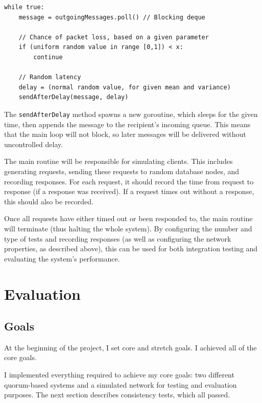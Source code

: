 \documentclass[12pt,a4paper,twoside,openany]{report}
\begin{document}
\begin{lstlisting}
while true:
    message = outgoingMessages.poll() // Blocking deque

    // Chance of packet loss, based on a given parameter
    if (uniform random value in range [0,1]) < x:
        continue

    // Random latency
    delay = (normal random value, for given mean and variance)
    sendAfterDelay(message, delay)
\end{lstlisting}

The \verb|sendAfterDelay| method spawns a new goroutine, which sleeps for the given time, then appends the message to the recipient's incoming queue. This means that the main loop will not block, so later messages will be delivered without uncontrolled delay.

The main routine will be responsible for simulating clients. This includes generating requests, sending these requests to random database nodes, and recording responses. For each request, it should record the time from request to response (if a response was received). If a request times out without a response, this should also be recorded.

Once all requests have either timed out or been responded to, the main routine will terminate (thus halting the whole system). By configuring the number and type of tests and recording responses (as well as configuring the network properties, as described above), this can be used for both integration testing and evaluating the system's performance.


\chapter{Evaluation}

\section{Goals}


At the beginning of the project, I set core and stretch goals. I achieved all of the core goals.

I implemented everything required to achieve my core goals: two different quorum-based systems and a simulated network for testing and evaluation purposes. The next section describes consistency tests, which all passed.
\end{document}

